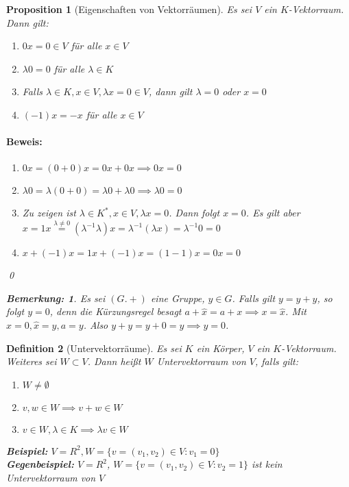 \documentclass{report}
\newcommand{\IN}[1]{\index{#1|BH}}
\newcommand{\lb}{\lambda}
\theoremstyle{customrem}
\newtheorem*{bemerkung}{Bemerkung\textnormal:}
\theoremstyle{customdef}
\newtheorem{definition}{Definition}[chapter]
\newtheorem{proposition}[definition]{Proposition}
\renewenvironment{proof}{\paragraph{Beweis: }}{\qed}
\begin{document}
	\begin{proposition}[Eigenschaften von Vektorräumen]
		Es sei \(V\) ein \(K\)-Vektorraum. Dann gilt:
		\begin{enumerate}[leftmargin=4cm]
			\itemsep0cm
			\item \(0 x = 0 \in V\) für alle \(x \in V\)
			\item \(\lb 0 = 0\) für alle \(\lb \in K\)
			\item Falls \(\lb \in K, x \in V, \lb x = 0 \in V\), dann gilt \(\lb = 0\) oder \(x = 0\)
			\item \((-1) x = -x\) für alle \(x \in V\)
		\end{enumerate}
		\begin{proof}
			\begin{enumerate}
				\itemsep0cm
				\item \(0 x = (0 + 0)x = 0x + 0x \implies 0x = 0\)
				\item \(\lb 0 = \lb(0 + 0) = \lb 0 + \lb 0 \implies \lb 0 = 0\)
				\item Zu zeigen ist \(\lb \in K^\ast, x \in V, \lb x = 0\). Dann folgt \(x = 0\). Es gilt aber \(x = 1 x \overset{\lb \neq 0}{=} (\lb ^{-1} \lb) x = \lb^{-1}(\lb x) = \lb^{-1} 0 = 0\)
				\item \(x + (-1) x = 1x + (-1) x = (1 - 1)  x = 0 x = 0\)
			\end{enumerate}
		\end{proof}
		\begin{bemerkung}
			Es sei \((G. +)\) eine Gruppe, \(y \in G\). Falls gilt \(y = y + y\), so folgt \(y = 0\), denn die Kürzungsregel besagt \(a + \hat{x} = a+x \implies x = \hat{x}\). Mit \(x = 0, \hat{x} = y, a = y\). Also \(y +y = y + 0 = y \implies y = 0\).
		\end{bemerkung}
	\end{proposition}
	
	\begin{definition}[Untervektorräume]
		\IN{Untervektorraum}
		Es sei \(K\) ein Körper, \(V\) ein \(K\)-Vektorraum. Weiteres sei \(W \subset V\). Dann heißt \(W\) Untervektorraum von \(V\), falls gilt:
		
		\begin{enumerate}[leftmargin=4cm]
			\itemsep0cm
			\item \(W \neq \emptyset\) 
			\item \(v, w \in W \implies v + w \in W\)
			\item \(v \in W, \lb \in K \implies \lb v \in W\)
		\end{enumerate}
		
		\textbf{Beispiel:}
		\(V = R^2, W = \{v = (v_1, v_2) \in V : v_1 = 0\}\)\\
		\textbf{Gegenbeispiel:}
		\(V = R^2\), \(W = \{v = (v_1, v_2) \in V : v_2 = 1\}\) ist kein Untervektorraum von \(V\)
	\end{definition}
	
\end{document}
